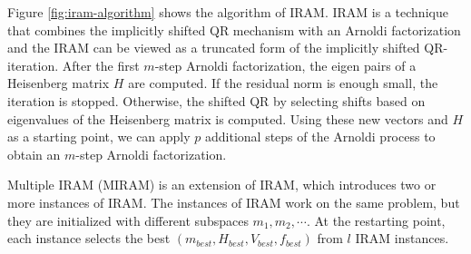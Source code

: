 \documentclass[graybox]{svmult}
\begin{document}
Figure \ref{fig:iram-algorithm} shows the algorithm of IRAM. IRAM is 
 a technique that combines the implicitly shifted QR mechanism with an Arnoldi factorization and the IRAM can be viewed as a truncated form of the implicitly shifted QR-iteration.
After the first $m$-step Arnoldi factorization, the eigen pairs of a Heisenberg matrix $H$ are computed. If the residual norm is enough small, the iteration is stopped. Otherwise, the shifted QR by selecting shifts based on eigenvalues of the Heisenberg matrix is computed. 
Using these new vectors and $H$ as a starting point, we can apply $p$ additional steps of the Arnoldi process to obtain an $m$-step Arnoldi factorization. 

Multiple IRAM (MIRAM) is an extension of IRAM, which introduces two or more instances of IRAM. 
The instances of IRAM work on the same problem, but they are initialized with different subspaces $m_1, m_2,\cdots $. 
At the restarting point, each instance selects the best $(m_{best}, H_{best}, V_{best}, f_{best})$ from $l$ IRAM instances. 
\end{document}
